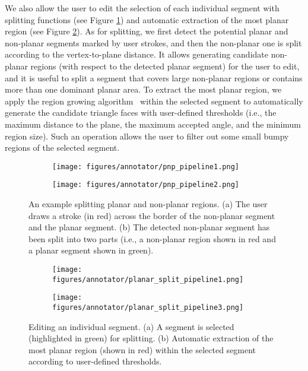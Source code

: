 We also allow the user to edit the selection of each individual segment with splitting functions (see Figure \ref{fig:pnp_func}) and automatic extraction of the most planar region (see Figure \ref{fig:seg_func}). 
As for splitting, we first detect the potential planar and non-planar segments marked by user strokes, and then the non-planar one is split according to the vertex-to-plane distance.
It allows generating candidate non-planar regions (with respect to the detected planar segment) for the user to edit, and
it is useful to split a segment that covers large non-planar regions or contains more than one dominant planar area.
To extract the most planar region, we apply the region growing algorithm~\citep{lafarge2012creating} within the selected segment to automatically generate the candidate triangle faces with user-defined thresholds (i.e., the maximum distance to the plane, the maximum accepted angle, and the minimum region size).
Such an operation allows the user to filter out some small bumpy regions of the selected segment.

\begin{figure}[!tb]
	\centering
	\begin{subfigure}[t]{0.48\textwidth}
		\texttt{[image: figures/annotator/pnp\_pipeline1.png]}
		\caption{}
	\end{subfigure}
	\hspace*{\fill}
	\begin{subfigure}[t]{0.48\textwidth}
		\texttt{[image: figures/annotator/pnp\_pipeline2.png]}
		\caption{}
	\end{subfigure}
	\caption{An example splitting planar and non-planar regions. 
		(a) The user draws a stroke (in red) across the border of the non-planar segment and the planar segment. 
		(b) The detected non-planar segment has been split into two parts (i.e., a non-planar region shown in red and a planar segment shown in green).
	} 
	\label{fig:pnp_func}
\end{figure}

\begin{figure}[!tb]
	\centering
	\begin{subfigure}[t]{0.48\textwidth}
		\texttt{[image: figures/annotator/planar\_split\_pipeline1.png]}
		\caption{}
	\end{subfigure}
	\hspace*{\fill}
	\begin{subfigure}[t]{0.48\textwidth}
		\texttt{[image: figures/annotator/planar\_split\_pipeline3.png]}
		\caption{}
	\end{subfigure}
	\caption{Editing an individual segment. 
		(a) A segment is selected (highlighted in green) for splitting. 
		(b) Automatic extraction of the most planar region (shown in red) within the selected segment according to user-defined thresholds.} 
	\label{fig:seg_func}
\end{figure}

